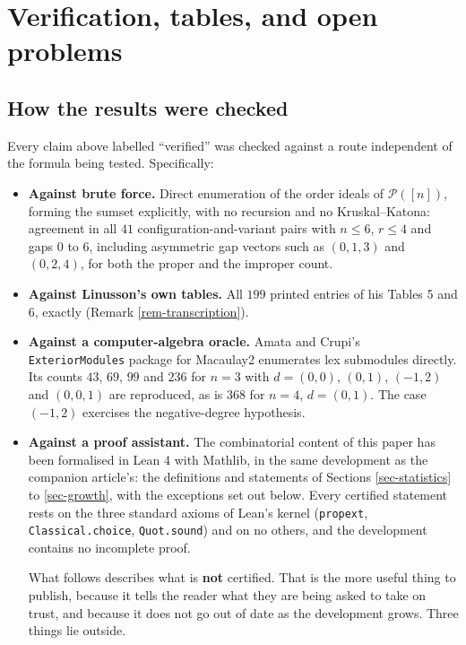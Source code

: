 \documentclass[11pt, a4paper, abstract=yes]{scrartcl}
\theoremstyle{definition}
\theoremstyle{remark}
\theoremstyle{plain}
\begin{document}
\section{Verification, tables, and open problems}
\label{sec-verification}
\subsection{How the results were checked}
\label{sec:org16cfa89}

Every claim above labelled ``verified'' was checked against a route independent of the formula being
tested. Specifically:

\begin{itemize}
\item \textbf{Against brute force.} Direct enumeration of the order ideals of \(\mathcal P([n])\), forming the
sumset explicitly, with no recursion and no Kruskal--Katona: agreement in all \(41\)
configuration-and-variant pairs with \(n\le6\), \(r\le4\) and gaps \(0\) to \(6\), including
asymmetric gap vectors such as \((0,1,3)\) and \((0,2,4)\), for both the proper and the improper
count.
\item \textbf{Against Linusson's own tables.} All \(199\) printed entries of his Tables 5 and 6, exactly
(Remark \ref{rem-transcription}).
\item \textbf{Against a computer-algebra oracle.} Amata and Crupi's \texttt{ExteriorModules} package \autocite{AmataCrupi2021} for Macaulay2
enumerates lex submodules directly. Its counts \(43\), \(69\), \(99\) and \(236\) for \(n=3\) with
\(d=(0,0)\), \((0,1)\), \((-1,2)\) and \((0,0,1)\) are reproduced, as is \(368\) for \(n=4\),
\(d=(0,1)\). The case \((-1,2)\) exercises the negative-degree hypothesis.
\item \textbf{Against a proof assistant.} The combinatorial content of this paper has been formalised in Lean 4
with Mathlib, in the same development as the companion article's: the definitions and statements of
Sections \ref{sec-statistics} to \ref{sec-growth}, with the exceptions set out below. Every certified
statement rests on the three standard axioms of Lean's kernel (\texttt{propext}, \texttt{Classical.choice},
\texttt{Quot.sound}) and on no others, and the development contains no incomplete proof.

What follows describes what is \textbf{not} certified. That is the more useful thing to publish, because
it tells the reader what they are being asked to take on trust, and because it does not go out of
date as the development grows. Three things lie outside.


\end{itemize}
\end{document}
